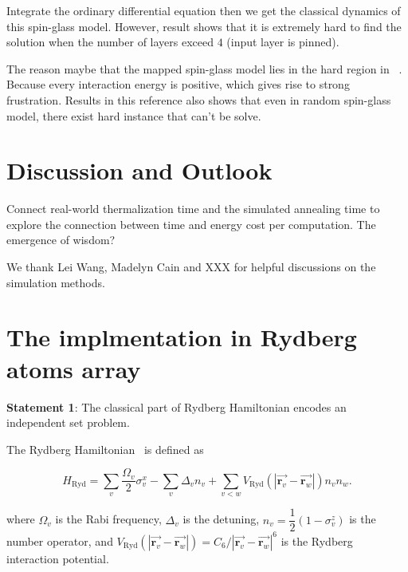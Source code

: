 \documentclass[twocolumn,superscriptaddress,english,showpacs,longbibliography]{revtex4-2}
\begin{document}
Integrate the ordinary differential equation then we get the classical
dynamics of this spin-glass model. However, result shows that it is
extremely hard to find the solution when the number of layers exceed
$4$ (input layer is pinned).

The reason maybe that the mapped spin-glass model lies in the hard
region in ~\cite{Wang2013}. Because every interaction energy is positive, which
gives rise to strong frustration. Results in this reference also shows that even in
random spin-glass model, there exist hard instance that can't be solve.

\section{Discussion and Outlook}
Connect real-world thermalization time and the simulated annealing time to explore the connection between time and energy cost per computation.
The emergence of wisdom?

\begin{acknowledgments}
    We thank Lei Wang, Madelyn Cain and XXX for helpful discussions on the simulation methods.
\end{acknowledgments}

%


\newpage
\appendix

\section{The implmentation in Rydberg atoms array}\label{physical-model-rydberg-atoms-array}

\textbf{Statement 1}: The classical part of Rydberg Hamiltonian encodes
an independent set problem.

The Rydberg Hamiltonian~\cite{Nguyen2023} is defined as

\begin{equation}
    H_{\text{Ryd}} = \sum_v \dfrac{\Omega_v}{2} \sigma^x_v -\sum_v \Delta_v n_v + \sum_{v < w}  V_{\text{Ryd}}(|\overrightarrow{\mathbf{r}_v} -\overrightarrow{\mathbf{r}_w}|)n_v n_w.
\end{equation}

where $\Omega_v$ is the Rabi frequency, $\Delta_v$ is the detuning,
$n_v = \dfrac{1}{2}(1 - \sigma^z_v)$ is the number operator, and
$V_{\text{Ryd}}(|\overrightarrow{\mathbf{r}_v} - \overrightarrow{\mathbf{r}_w}|) = C_6/|\overrightarrow{\mathbf{r}_v} - \overrightarrow{\mathbf{r}_w}|^6$
is the Rydberg interaction potential.
\end{document}
